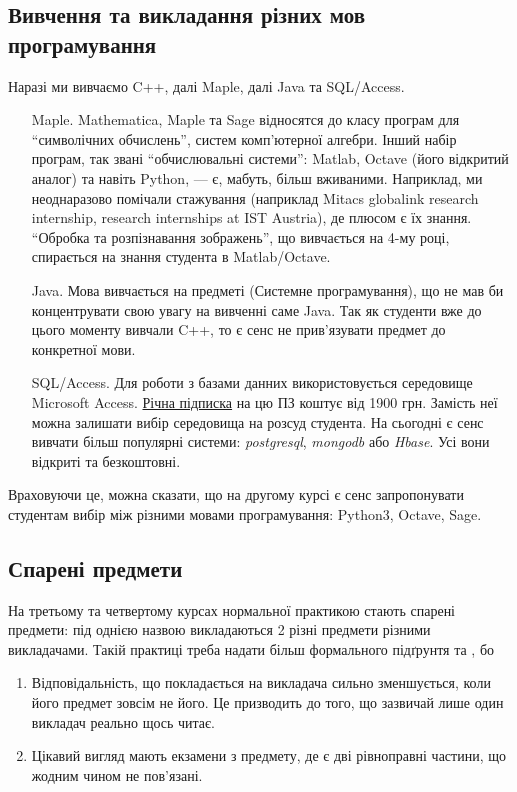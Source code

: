 \documentclass[14pt, a4paper]{extarticle}  %
\begin{document}
\subsection{Вивчення та викладання різних мов програмування}
\label{Languages}

Наразі ми вивчаємо C++, далі Maple, далі Java та SQL/Access. 
\begin{itemize}
    \item [Maple.] Mathematica, Maple та Sage відносятся до класу програм для ``символічних обчислень'', систем комп'ютерної алгебри. Інший набір програм, так звані ``обчислювальні системи'': Matlab, Octave (його відкритий аналог) та навіть Python, --- є, мабуть, більш вживаними. Наприклад, ми неоднаразово помічали стажування (наприклад Mitacs globalink research internship, research internships at IST Austria), де плюсом є їх знання. ``Обробка та розпізнавання зображень'', що вивчається на 4-му році, спирається на знання студента в Matlab/Octave. 
    
    \item [Java.] Мова вивчається на предметі (Системне програмування), що не мав би концентрувати свою увагу на вивченні саме Java. Так як студенти вже до цього моменту вивчали C++, то є сенс не прив'язувати предмет до конкретної мови. 
    
    \item [SQL/Access.] Для роботи з базами данних використовується середовище Microsoft Access. \href{https://products.office.com/uk-UA/buy/office}{Річна підписка} на цю ПЗ коштує від 1900 грн. Замість неї можна залишати вибір середовища на розсуд студента. На сьогодні є сенс вивчати більш популярні системи: \textit{postgresql}, \textit{mongodb} або \textit{Hbase}. Усі вони відкриті та безкоштовні. 
\end{itemize}

Враховуючи це, можна сказати, що на другому курсі є сенс запропонувати студентам вибір між різними мовами програмування: Python3, Octave, Sage. 


\subsection{Спарені предмети}
\label{conjunctions}
На третьому та четвертому курсах нормальної практикою стають спарені предмети: під однією назвою викладаються 2 різні предмети різними викладачами. Такій практиці треба надати більш формального підґрунтя та , бо 
\begin{enumerate}
    \item Відповідальність, що покладається на викладача сильно зменшується, коли його предмет зовсім не його. Це призводить до того, що зазвичай лише один викладач реально щось читає.
    \item Цікавий вигляд мають екзамени з предмету, де є дві рівноправні частини, що жодним чином не пов'язані. 
\end{enumerate}
\end{document}
